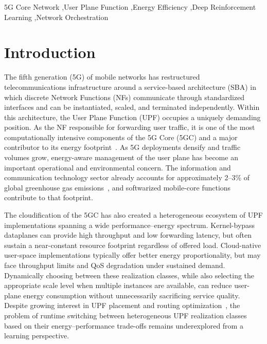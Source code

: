 \documentclass[a4paper,fleqn]{cas-sc}
\begin{document}

\begin{keywords}
5G Core Network \sep User Plane Function \sep Energy Efficiency \sep Deep Reinforcement Learning \sep Network Orchestration
\end{keywords}

\maketitle


\section{Introduction}
\label{intro}

The fifth generation (5G) of mobile networks has restructured telecommunications infrastructure around a service-based architecture (SBA) in which discrete Network Functions (NFs) communicate through standardized interfaces and can be instantiated, scaled, and terminated independently. Within this architecture, the User Plane Function (UPF) occupies a uniquely demanding position. As the NF responsible for forwarding user traffic, it is one of the most computationally intensive components of the 5G Core (5GC) and a major contributor to its energy footprint~\cite{bellin2024comnet,chen2024comcom}. As 5G deployments densify and traffic volumes grow, energy-aware management of the user plane has become an important operational and environmental concern. The information and communication technology sector already accounts for approximately 2--3\% of global greenhouse gas emissions~\cite{freitag2021patterns}, and softwarized mobile-core functions contribute to that footprint.

The cloudification of the 5GC has also created a heterogeneous ecosystem of UPF implementations spanning a wide performance--energy spectrum. Kernel-bypass dataplanes can provide high throughput and low forwarding latency, but often sustain a near-constant resource footprint regardless of offered load. Cloud-native user-space implementations typically offer better energy proportionality, but may face throughput limits and QoS degradation under sustained demand. Dynamically choosing between these realization classes, while also selecting the appropriate scale level when multiple instances are available, can reduce user-plane energy consumption without unnecessarily sacrificing service quality. Despite growing interest in UPF placement and routing optimization~\cite{chen2024comcom}, the problem of runtime switching between heterogeneous UPF realization classes based on their energy--performance trade-offs remains underexplored from a learning perspective.
\end{document}
